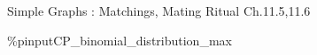 \documentclass[handout]{mcs}
\begin{document}

\begin{staffnotes}
Simple Graphs : Matchings, Mating Ritual Ch.11.5,11.6
\end{staffnotes}








\%pinput{CP_binomial_distribution_max}


\end{document}
